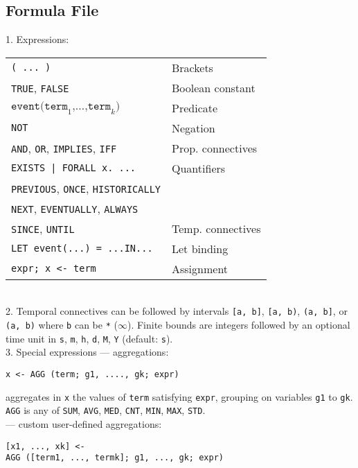 \documentclass[a4paper,9pt]{extarticle}
\begin{document}
\begin{multicols}{2}
\section{Formula File}
\begin{tcolorbox}
  1. Expressions: \\
  \begin{tabular}{ll}
    \texttt{( ... )} & Brackets \\
    \texttt{TRUE}, \texttt{FALSE} & Boolean constant \\
    $\texttt{event}\texttt{(term}_1\texttt{,}\dots\texttt{,term}_k\texttt{)}$ & Predicate \\
    \texttt{NOT} & Negation \\
    \texttt{AND}, \texttt{OR}, \texttt{IMPLIES}, \texttt{IFF} & Prop. connectives \\
    \texttt{EXISTS | FORALL~x. ...} & Quantifiers \\
    \texttt{PREVIOUS}, \texttt{ONCE}, \texttt{HISTORICALLY} & \\
    \texttt{NEXT}, \texttt{EVENTUALLY}, \texttt{ALWAYS} & \\
    \texttt{SINCE}, \texttt{UNTIL} & Temp. connectives \\
    \texttt{LET event(...) = ...IN...} & Let binding \\
    \texttt{expr; x <- term} & Assignment
  \end{tabular}
  \\[5pt]
  
  2. Temporal connectives can be followed by intervals \texttt{[a, b]}, \texttt{[a, b)},
  \texttt{(a, b]}, or \texttt{(a, b)} where \texttt{b} can be \texttt{*} ($\infty$).
  Finite bounds are integers followed by an optional time unit in \texttt{s}, \texttt{m},
  \texttt{h}, \texttt{d}, \texttt{M}, \texttt{Y} (default: \texttt{s}).\\[5pt]
  3. Special expressions --- aggregations:
\begin{verbatim}
x <- AGG (term; g1, ...., gk; expr)
\end{verbatim}
  aggregates in \texttt{x} the values of \texttt{term} satisfying \texttt{expr}, grouping on
  variables \texttt{g1} to \texttt{gk}. \texttt{AGG} is any of \texttt{SUM}, \texttt{AVG},
  \texttt{MED}, \texttt{CNT}, \texttt{MIN}, \texttt{MAX}, \texttt{STD}.
\\[5pt]
  --- custom user-defined aggregations:
\begin{verbatim}
[x1, ..., xk] <- 
AGG ([term1, ..., termk]; g1, ..., gk; expr)
\end{verbatim}


\end{tcolorbox}
\end{multicols}
\end{document}
